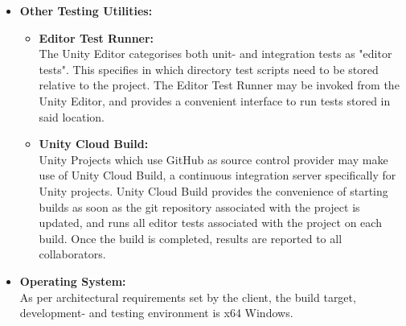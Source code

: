 \documentclass[a4paper,12pt]{article}
\begin{document}
\begin{itemize}
\begin{itemize}
			\end{itemize}
		\item \textbf{Other Testing Utilities:}
			\begin{itemize}
				\item \textbf{Editor Test Runner:}\\
				The Unity Editor categorises both unit- and integration tests as "editor tests". This specifies in which directory test scripts need to be stored relative to the project. The Editor Test Runner may be invoked from the Unity Editor, and provides a convenient interface to run tests stored in said location.
				\item \textbf{Unity Cloud Build:}\\
				Unity Projects which use GitHub as source control provider may make use of Unity Cloud Build, a continuous integration server specifically for Unity projects. Unity Cloud Build provides the convenience of starting builds as soon as the git repository associated with the project is updated, and runs all editor tests associated with the project on each build. Once the build is completed, results are reported to all collaborators.
			\end{itemize}
		\item \textbf{Operating System:}\\
		As per architectural requirements set by the client, the build target, development- and testing environment is x64 Windows.
	\end{itemize}
\end{document}
